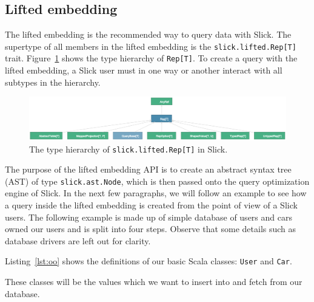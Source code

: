 \subsection{Lifted embedding} %
\label{sub:LiftedEmbedding}
The lifted embedding is the recommended way to query data with Slick.
The supertype of all members in the lifted embedding is the \texttt{slick.lifted.Rep[T]} trait.
Figure~\ref{fig:rep} shows the type hierarchy of \texttt{Rep[T]}.
To create a query with the lifted embedding, a Slick user must in one way or another interact with all subtypes in the hierarchy.
\begin{figure}
    \centering
    \includegraphics[width=\textwidth]{img/rep.png}
    \caption{The type hierarchy of \texttt{slick.lifted.Rep[T]} in Slick.}\label{fig:rep}
\end{figure}
The purpose of the lifted embedding API is to create an abstract syntax tree (AST) of type \texttt{slick.ast.Node}, which is then passed onto the query optimization engine of Slick.
In the next few paragraphs, we will follow an example to see how a query inside the lifted embedding is created from the point of view of a Slick users.
The following example is made up of simple database of users and cars owned our users and is split into four steps.
Observe that some details such as database drivers are left out for clarity.


Listing~\ref{lst:oo} shows the definitions of our basic Scala classes: \texttt{User} and \texttt{Car}.

These classes will be the values which we want to insert into and fetch from our database.

